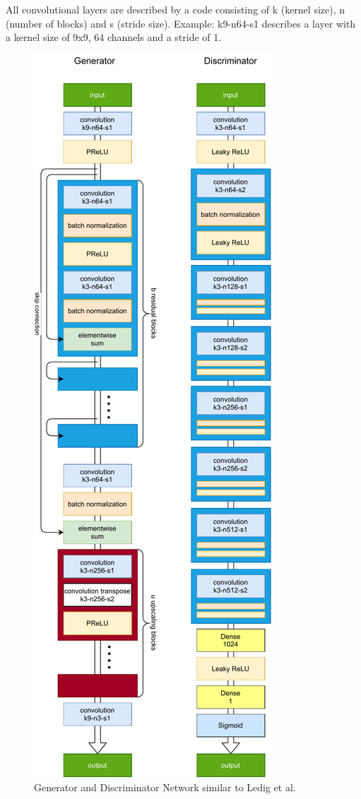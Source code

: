 \documentclass[11pt,twocolumn,twoside,paper=a4]{IEEEtran}
\begin{document}
All convolutional layers are described by a code consisting of k (kernel size), n (number of blocks) and s (stride size). Example: k9-n64-s1 describes a layer with a kernel size of 9x9, 64 channels and a stride of 1.

\begin{center}
    \begin{figure}[h] 
        \includegraphics[scale=0.7]{../images/gen_and_dis.pdf}  
        \caption{Generator and Discriminator Network similar to Ledig et al.~\cite{DBLP:journals/corr/LedigTHCATTWS16} }   
        \label{fig:network_architecture}
    \end{figure} 
\end{center}
\end{document}
